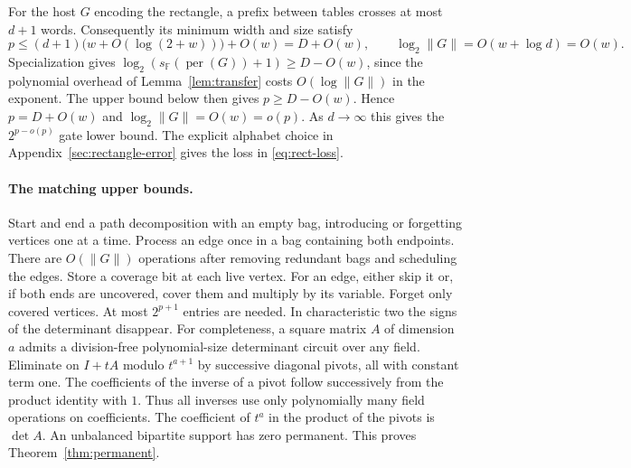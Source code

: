 \documentclass[11pt]{article}
\theoremstyle{definition}
\newcommand{\F}{\mathbb F}
\newcommand{\per}{\operatorname{per}}
\begin{document}
For the host \(G\) encoding the rectangle, a prefix between tables crosses at most \(d+1\) words. Consequently its minimum width and size satisfy
\[
 p\le(d+1)\bigl(w+O(\log(2+w))\bigr)+O(w)=D+O(w),
 \qquad \log_2 \|G\|=O(w+\log d)=O(w).
\]
Specialization gives \(\log_2(s_{\F}(\per(G))+1)\ge D-O(w)\), since the polynomial overhead of Lemma~\ref{lem:transfer} costs \(O(\log \|G\|)\) in the exponent. The upper bound below then gives \(p\ge D-O(w)\). Hence \(p=D+O(w)\) and \(\log_2 \|G\|=O(w)=o(p)\). As \(d\to\infty\) this gives the \(2^{p-o(p)}\) gate lower bound. The explicit alphabet choice in Appendix~\ref{sec:rectangle-error} gives the loss in \eqref{eq:rect-loss}.

\paragraph{The matching upper bounds.}
Start and end a path decomposition with an empty bag, introducing or forgetting vertices one at a time. Process an edge once in a bag containing both endpoints. There are \(O(\|G\|)\) operations after removing redundant bags and scheduling the edges. Store a coverage bit at each live vertex. For an edge, either skip it or, if both ends are uncovered, cover them and multiply by its variable. Forget only covered vertices. At most \(2^{p+1}\) entries are needed. In characteristic two the signs of the determinant disappear. For completeness, a square matrix \(A\) of dimension \(a\) admits a division-free polynomial-size determinant circuit over any field. Eliminate on \(I+tA\) modulo \(t^{a+1}\) by successive diagonal pivots, all with constant term one. The coefficients of the inverse of a pivot follow successively from the product identity with \(1\). Thus all inverses use only polynomially many field operations on coefficients. The coefficient of \(t^a\) in the product of the pivots is \(\det A\). An unbalanced bipartite support has zero permanent. This proves Theorem~\ref{thm:permanent}.
\end{document}
